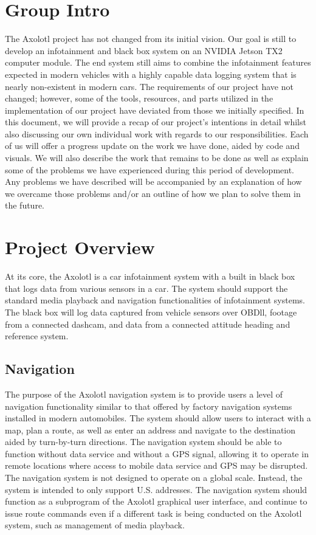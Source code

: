 \documentclass[onecolumn, draftclsnofoot,10pt, compsoc]{IEEEtran}
\begin{document}
\section{Group Intro}
The Axolotl project has not changed from its initial vision. Our goal is still to develop an infotainment and black box system on an NVIDIA Jetson TX2 computer module. The end system still aims to combine the infotainment features expected in modern vehicles with a highly capable data logging system that is nearly non-existent in modern cars. The requirements of our project have not changed; however, some of the tools, resources, and parts utilized in the implementation of our project have deviated from those we initially specified. In this document, we will provide a recap of our project's intentions in detail whilst also discussing our own individual work with regards to our responsibilities. Each of us will offer a progress update on the work we have done, aided by code and visuals. We will also describe the work that remains to be done as well as explain some of the problems we have experienced during this period of development. Any problems we have described will be accompanied by an explanation of how we overcame those problems and/or an outline of how we plan to solve them in the future.

\section{Project Overview}
At its core, the Axolotl is a car infotainment system with a built in black box that logs data from various sensors in a car. The system should support the standard media playback and navigation functionalities of infotainment systems. The black box will log data captured from vehicle sensors over OBDll, footage from a connected dashcam, and data from a connected attitude heading and reference system.

\subsection{Navigation}
The purpose of the Axolotl navigation system is to provide users a level of navigation functionality similar to that offered by factory navigation systems installed in modern automobiles. The system should allow users to interact with a map, plan a route, as well as enter an address and navigate to the destination aided by turn-by-turn directions. The navigation system should be able to function without data service and without a GPS signal, allowing it to operate in remote locations where access to mobile data service and GPS may be disrupted.
The navigation system is not designed to operate on a global scale. Instead, the system is intended to only support U.S. addresses. The navigation system should function as a subprogram of the Axolotl graphical user interface, and continue to issue route commands even if a different task is being conducted on the Axolotl system, such as management of media playback.
\end{document}
